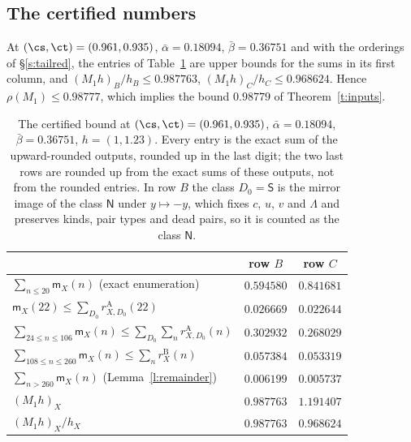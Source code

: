 \subsection{The certified numbers}\label{s:tailnumbers}

\begin{proposition}\label{p:tail}
At $(\cs, \ct) = (0.961, 0.935)$, $\bar\alpha = 0.18094$, $\bar\beta = 0.36751$ and with the orderings of \S\ref{s:tailred}, the entries of Table~\ref{tab:tail} are upper bounds for the sums in its first column, and $(M_1 h)_B / h_B \le 0.987763$, $(M_1 h)_C / h_C \le 0.968624$. Hence $\rho(M_1) \le 0.98777$, which implies the bound $0.98779$ of Theorem~\ref{t:inputs}.
\end{proposition}

\begin{table}[ht]
\centering
\begin{tabular}{lcc}
 & row $B$ & row $C$ \\ \hline
$\sum_{n \le 20} \mathsf m_X(n)$ (exact enumeration) & $0.594580$ & $0.841681$ \\
$\mathsf m_X(22) \le \sum_{D_0} r^{\mathrm A}_{X, D_0}(22)$ & $0.026669$ & $0.022644$ \\
$\sum_{24 \le n \le 106} \mathsf m_X(n) \le \sum_{D_0} \sum_n r^{\mathrm A}_{X, D_0}(n)$ & $0.302932$ & $0.268029$ \\
$\sum_{108 \le n \le 260} \mathsf m_X(n) \le \sum_n r^{\mathrm B}_X(n)$ & $0.057384$ & $0.053319$ \\
$\sum_{n > 260} \mathsf m_X(n)$ (Lemma~\ref{l:remainder}) & $0.006199$ & $0.005737$ \\ \hline
$(M_1 h)_X$ & $0.987763$ & $1.191407$ \\
$(M_1 h)_X / h_X$ & $0.987763$ & $0.968624$
\end{tabular}
\caption{The certified bound at $(\cs, \ct) = (0.961, 0.935)$, $\bar\alpha = 0.18094$, $\bar\beta = 0.36751$, $h = (1, 1.23)$. Every entry is the exact sum of the upward-rounded outputs, rounded up in the last digit; the two last rows are rounded up from the exact sums of these outputs, not from the rounded entries. In row $B$ the class $D_0 = \mathsf S$ is the mirror image of the class $\mathsf N$ under $y \mapsto -y$, which fixes $c$, $u$, $v$ and $\Lambda$ and preserves kinds, pair types and dead pairs, so it is counted as the class $\mathsf N$.}\label{tab:tail}
\end{table}

